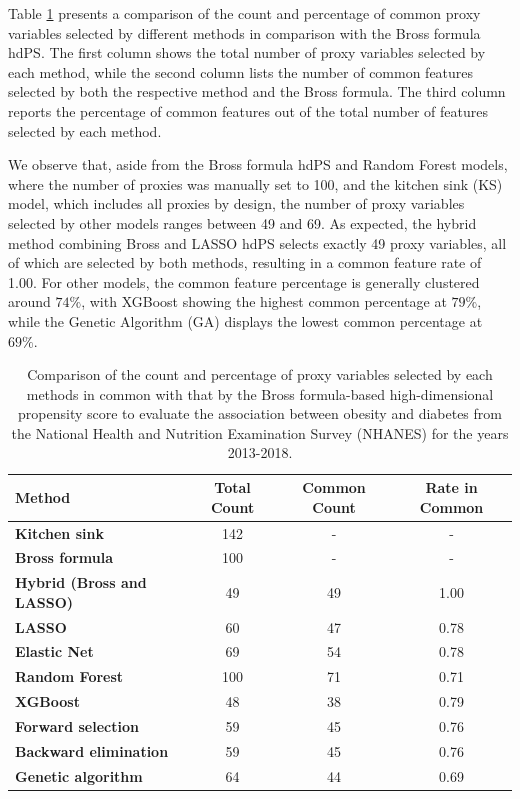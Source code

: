 \documentclass[sn-vancouver,Numbered,lineno,pdflatex]{sn-jnl}
\begin{document}
Table \ref{tab:proxy-common-pct-bross} presents a comparison of the
count and percentage of common proxy variables selected by different
methods in comparison with the Bross formula hdPS. The first column
shows the total number of proxy variables selected by each method, while
the second column lists the number of common features selected by both
the respective method and the Bross formula. The third column reports
the percentage of common features out of the total number of features
selected by each method.

We observe that, aside from the Bross formula hdPS and Random Forest
models, where the number of proxies was manually set to 100, and the
kitchen sink (KS) model, which includes all proxies by design, the
number of proxy variables selected by other models ranges between 49 and
69. As expected, the hybrid method combining Bross and LASSO hdPS
selects exactly 49 proxy variables, all of which are selected by both
methods, resulting in a common feature rate of 1.00. For other models,
the common feature percentage is generally clustered around \(74\%\),
with XGBoost showing the highest common percentage at \(79\%\), while
the Genetic Algorithm (GA) displays the lowest common percentage at
\(69\%\).

\begin{table}[htbp]
\centering
\caption{Comparison of the count and percentage of proxy variables selected by each methods in common with that by the Bross formula-based high-dimensional propensity score to evaluate the association between obesity and diabetes from the National Health and Nutrition Examination Survey (NHANES) for the years 2013-2018.}
\label{tab:proxy-common-pct-bross}
\begin{tabular}{lccc}
\toprule
\textbf{Method} & \textbf{Total Count} & \textbf{Common Count} & \textbf{Rate in Common} \\ 
\midrule
\textbf{Kitchen sink} & 142 & - & - \\
\textbf{Bross formula} & 100 & - & - \\
\textbf{Hybrid (Bross and LASSO)} & 49 & 49 & 1.00 \\
\textbf{LASSO} & 60 & 47 & 0.78 \\
\textbf{Elastic Net} & 69 & 54 & 0.78 \\
\textbf{Random Forest} & 100 & 71 & 0.71 \\  
\textbf{XGBoost} & 48 & 38 & 0.79 \\
\textbf{Forward selection} & 59 & 45 & 0.76 \\
\textbf{Backward elimination} & 59 & 45 & 0.76 \\
\textbf{Genetic algorithm} & 64 & 44 & 0.69 \\
\bottomrule
\end{tabular}
\end{table}
\end{document}
